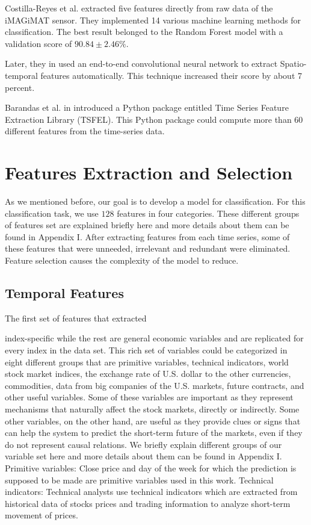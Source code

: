 Costilla-Reyes et al. \cite{Costilla-Reyes2016TemporalSystem} extracted five features directly from raw data of the iMAGiMAT sensor. They implemented 14 various machine learning methods for classification. The best result belonged to the Random Forest model with a validation score of $90.84 \pm 2.46\%$. 

Later, they in \cite{Costilla-Reyes2018DeepSensors} used an end-to-end convolutional neural network to extract Spatio-temporal features automatically. This technique increased their score by about 7 percent.

Barandas et al. in \cite{Barandas2020TSFEL:Library} introduced a Python package entitled Time Series Feature Extraction Library (TSFEL). This Python package could compute more than 60 different features from the time-series data.



\section{Features Extraction and Selection}

As we mentioned before, our goal is to develop a model for
classification. For this classification task, we use $128$ features in four categories. These different groups of features set are explained briefly here and more details about them can be found in Appendix I. After extracting features from each time series, some of these features that were unneeded, irrelevant and redundant were eliminated. Feature selection causes the complexity of the model to reduce.

\subsection{Temporal Features}
The first set of features that extracted




index-specific while the rest are general economic variables and
are replicated for every index in the data set. This rich set of variables could be categorized in eight different groups that are primitive variables, technical indicators, world stock market indices, the
exchange rate of U.S. dollar to the other currencies, commodities,
data from big companies of the U.S. markets, future contracts, and
other useful variables. Some of these variables are important as
they represent mechanisms that naturally affect the stock markets,
directly or indirectly. Some other variables, on the other hand, are
useful as they provide clues or signs that can help the system to
predict the short-term future of the markets, even if they do not
represent causal relations. We briefly explain different groups of
our variable set here and more details about them can be found in
Appendix I.
Primitive variables: Close price and day of the week for which
the prediction is supposed to be made are primitive variables used
in this work.
Technical indicators: Technical analysts use technical indicators
which are extracted from historical data of stocks prices and trading information to analyze short-term movement of prices.




